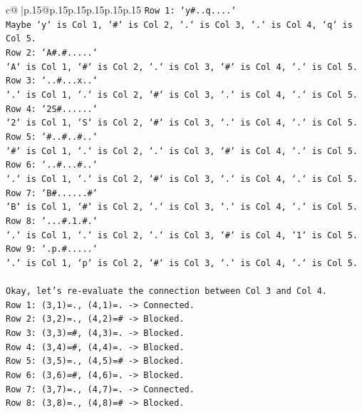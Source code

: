 \documentclass{article}
\begin{document}
{\begin{supertabular}{c@{$\;$}|p{.15\linewidth}@{}p{.15\linewidth}p{.15\linewidth}p{.15\linewidth}p{.15\linewidth}p{.15\linewidth}}
{{{\texttt{Row 1: `y\#..q....`} \\
\texttt{Maybe `y` is Col 1, `\#` is Col 2, `.` is Col 3, `.` is Col 4, `q` is Col 5.} \\
\texttt{Row 2: `A\#.\#.....`} \\
\texttt{`A` is Col 1, `\#` is Col 2, `.` is Col 3, `\#` is Col 4, `.` is Col 5.} \\
\texttt{Row 3: `..\#...x..`} \\
\texttt{`.` is Col 1, `.` is Col 2, `\#` is Col 3, `.` is Col 4, `.` is Col 5.} \\
\texttt{Row 4: `2S\#......`} \\
\texttt{`2` is Col 1, `S` is Col 2, `\#` is Col 3, `.` is Col 4, `.` is Col 5.} \\
\texttt{Row 5: `\#..\#..\#..`} \\
\texttt{`\#` is Col 1, `.` is Col 2, `.` is Col 3, `\#` is Col 4, `.` is Col 5.} \\
\texttt{Row 6: `..\#...\#..`} \\
\texttt{`.` is Col 1, `.` is Col 2, `\#` is Col 3, `.` is Col 4, `.` is Col 5.} \\
\texttt{Row 7: `B\#......\#`} \\
\texttt{`B` is Col 1, `\#` is Col 2, `.` is Col 3, `.` is Col 4, `.` is Col 5.} \\
\texttt{Row 8: `...\#.1.\#.`} \\
\texttt{`.` is Col 1, `.` is Col 2, `.` is Col 3, `\#` is Col 4, `1` is Col 5.} \\
\texttt{Row 9: `.p.\#.....`} \\
\texttt{`.` is Col 1, `p` is Col 2, `\#` is Col 3, `.` is Col 4, `.` is Col 5.} \\
\\ 
\texttt{Okay, let's re{-}evaluate the connection between Col 3 and Col 4.} \\
\texttt{Row 1: (3,1)=., (4,1)=. {-}> Connected.} \\
\texttt{Row 2: (3,2)=., (4,2)=\# {-}> Blocked.} \\
\texttt{Row 3: (3,3)=\#, (4,3)=. {-}> Blocked.} \\
\texttt{Row 4: (3,4)=\#, (4,4)=. {-}> Blocked.} \\
\texttt{Row 5: (3,5)=., (4,5)=\# {-}> Blocked.} \\
\texttt{Row 6: (3,6)=\#, (4,6)=. {-}> Blocked.} \\
\texttt{Row 7: (3,7)=., (4,7)=. {-}> Connected.} \\
\texttt{Row 8: (3,8)=., (4,8)=\# {-}> Blocked.} \\
}}}
\end{supertabular}}
\end{document}
